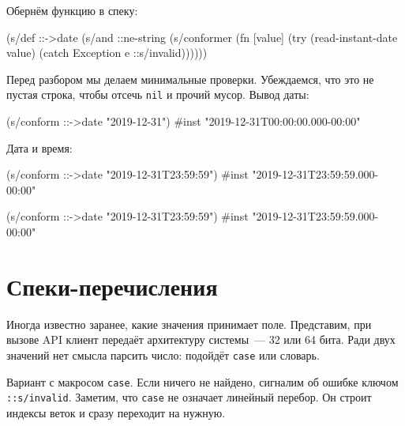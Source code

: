 \fi

Обернём функцию в спеку:

\begin{english}
  \begin{clojure}
(s/def ::->date
  (s/and
   ::ne-string
   (s/conformer
    (fn [value]
      (try
        (read-instant-date value)
        (catch Exception e
          ::s/invalid))))))
  \end{clojure}
\end{english}

Перед разбором мы делаем минимальные проверки. Убеждаемся, что это не пустая
строка, чтобы отсечь \verb|nil| и прочий мусор. Вывод даты:

\begin{english}
  \begin{clojure}
(s/conform ::->date "2019-12-31")
#inst "2019-12-31T00:00:00.000-00:00"
  \end{clojure}
\end{english}

\noindent
Дата и время:

\ifx\devicetype\mobile

\begin{english}
  \begin{clojure}
(s/conform ::->date
           "2019-12-31T23:59:59")
#inst "2019-12-31T23:59:59.000-00:00"
  \end{clojure}
\end{english}

\else

\begin{english}
  \begin{clojure}
(s/conform ::->date "2019-12-31T23:59:59")
#inst "2019-12-31T23:59:59.000-00:00"
  \end{clojure}
\end{english}

\fi

\section{Спеки-перечисления}


Иногда известно заранее, какие значения принимает поле. Представим, при вызове
API клиент передаёт архитектуру системы~--- 32 или 64 бита. Ради двух значений
нет смысла парсить число: подойдёт \verb|case| или словарь.

Вариант с макросом \verb|case|. Если ничего не найдено, сигналим об ошибке
ключом \verb|::s/invalid|. Заметим, что \verb|case| не означает линейный
перебор. Он строит индексы веток и сразу переходит на нужную.

